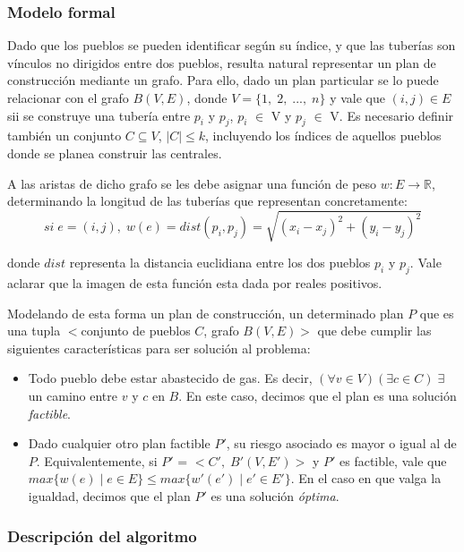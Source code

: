 \subsubsection{Modelo formal}

Dado que los pueblos se pueden identificar según su índice, y que las tuberías son vínculos no dirigidos entre dos pueblos, resulta natural representar un plan de construcción mediante un grafo. Para ello, dado un plan particular se lo puede relacionar con el grafo $B(V, E)$, donde $V = \{1,\;2,\;...,\;n\}$ y vale que $(i,j) \in E$ sii se construye una tubería entre $p_i$ y $p_j$, $p_i$ $\in$ V y $p_j$ $\in$ V. Es necesario definir también un conjunto $C \subseteq V$, $|C| \leq k$, incluyendo los índices de aquellos pueblos donde se planea construir las centrales.

A las aristas de dicho grafo se les debe asignar una función de peso $w:E\rightarrow\mathbb{R}$, determinando la longitud de las tuberías que representan concretamente:
$$si\;e = (i,j),\;w(e) = dist(p_i,p_j) = \sqrt{(x_i - x_j)^2 + (y_i - y_j)^2}$$

donde $dist$ representa la distancia euclidiana entre los dos pueblos $p_i$ y $p_j$. Vale aclarar que la imagen de esta función esta dada por reales positivos.

Modelando de esta forma un plan de construcción, un determinado plan $P$ que es una tupla $<$conjunto de pueblos $C$, grafo $B(V, E)>$ que debe cumplir las siguientes características para ser solución al problema:

\begin{itemize}
  \item Todo pueblo debe estar abastecido de gas. Es decir, $(\forall v \in V)(\exists c \in C)\;\exists$ un camino entre $v$ y $c$ en $B$. En este caso, decimos que el plan es una solución \emph{factible}.
  
  \item Dado cualquier otro plan factible $P'$, su riesgo asociado es mayor o igual al de $P$. Equivalentemente, si $P'$ = $<C',\;B'(V, E')>$ y $P'$ es factible, vale que $max\{w(e)\;|\;e\in E\} \leq max\{w'(e')\;|\;e'\in E'\}$. En el caso en que valga la igualdad, decimos que el plan $P'$ es una solución \emph{óptima}.
\end{itemize}

\subsubsection{Descripción del algoritmo}

